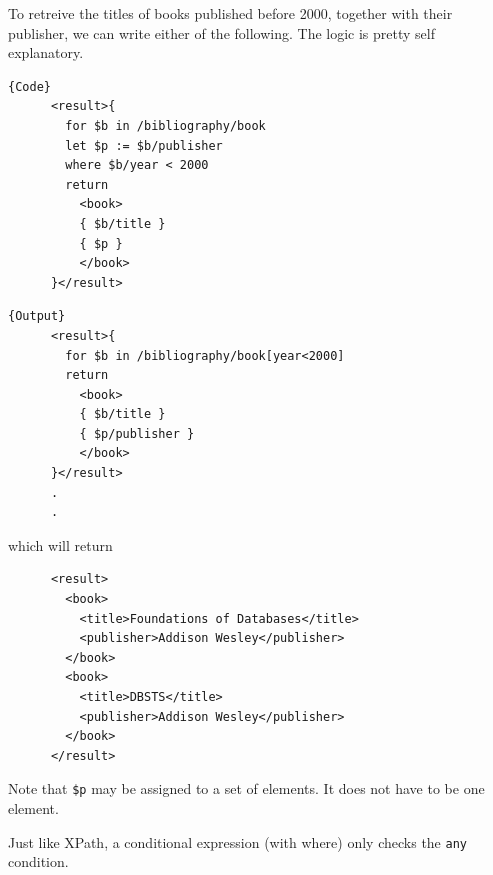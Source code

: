   \begin{example}
    To retreive the titles of books published before 2000, together with their publisher, we can write either of the following. The logic is pretty self explanatory. 

    \noindent\begin{minipage}{.5\textwidth}
    \begin{lstlisting}[]{Code}
      <result>{
        for $b in /bibliography/book 
        let $p := $b/publisher 
        where $b/year < 2000 
        return 
          <book>
          { $b/title }
          { $p }
          </book>
      }</result>
    \end{lstlisting}
    \end{minipage}
    \hfill
    \begin{minipage}{.49\textwidth}
    \begin{lstlisting}[]{Output}
      <result>{
        for $b in /bibliography/book[year<2000]
        return 
          <book>
          { $b/title }
          { $p/publisher }
          </book>
      }</result>
      .
      .
    \end{lstlisting}
    \end{minipage}
    which will return 
    \begin{lstlisting}
      <result>
        <book>
          <title>Foundations of Databases</title>
          <publisher>Addison Wesley</publisher>
        </book>
        <book>
          <title>DBSTS</title>
          <publisher>Addison Wesley</publisher>
        </book>
      </result> 
    \end{lstlisting}
    Note that \texttt{\$p} may be assigned to a set of elements. It does not have to be one element. 
  \end{example}

  Just like XPath, a conditional expression (with where) only checks the \texttt{any} condition. 
  
